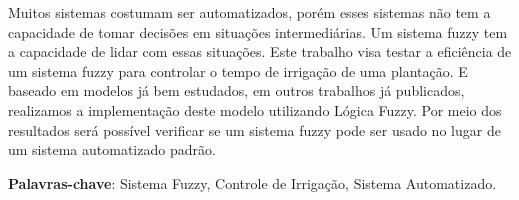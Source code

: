 \documentclass[
	article,			%
	11pt,				%
	oneside,			%
	a4paper,			%
	english,			%
	brazil,				%
	sumario=tradicional
	]{abntex2}
\begin{document}

\frenchspacing 

%

%
\maketitle


\begin{resumoumacoluna}
{\large 
  Muitos sistemas costumam ser automatizados, porém esses sistemas não tem a capacidade de tomar decisões em situações intermediárias. Um sistema fuzzy tem a capacidade de lidar com essas situações. Este trabalho visa testar a eficiência de um sistema fuzzy para controlar o tempo de irrigação de uma plantação. E baseado em modelos já bem estudados, em outros trabalhos já publicados, realizamos a implementação deste modelo utilizando Lógica Fuzzy. Por meio dos resultados será possível verificar se um sistema fuzzy pode ser usado no lugar de um sistema automatizado padrão.
  
 \noindent
 \textbf{Palavras-chave}: Sistema Fuzzy, Controle de Irrigação, Sistema Automatizado.

 \vspace{\onelineskip}
} 
\end{resumoumacoluna}


\textual

\end{document}
